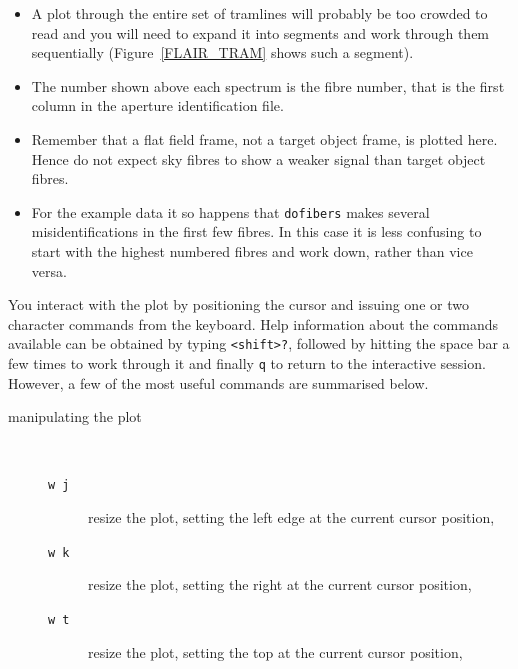 \documentclass[chapters,twoside,11pt]{starlink}
\begin{document}
\begin{enumerate}
  \begin{itemize}

    \item A plot through the entire set of tramlines will probably be
     too crowded to read and you will need to expand it into segments and
     work through them sequentially (Figure~\ref{FLAIR_TRAM} shows such a
     segment).

    \item The number shown above each spectrum is the fibre number, that
     is the first column in the aperture identification file.

    \item Remember that a flat field frame, not a target object frame,
     is plotted here.  Hence do not expect sky fibres to show a weaker
     signal than target object fibres.

    \item For the example data it so happens that \texttt{dofibers} makes
     several misidentifications in the first few fibres.  In this case
     it is less confusing to start with the highest numbered fibres
     and work down, rather than vice versa.

  \end{itemize}

   You interact with the plot by positioning the cursor and issuing
   one or two character commands from the keyboard.  Help information
   about the commands available can be obtained by typing \texttt{<shift>?}, followed by hitting the space bar a few times to work
   through it and finally \texttt{q} to return to the interactive session.
   However, a few of the most useful commands are summarised below.

  \begin{description}

    \item[manipulating the plot] ~

    \begin{description}

      \item[\texttt{w~j}] resize the plot, setting the left edge at the
       current cursor position,

      \item[\texttt{w~k}] resize the plot, setting the right at the
       current cursor position,

      \item[\texttt{w~t}] resize the plot, setting the top at the
       current cursor position,


\end{description}
\end{description}
\end{enumerate}
\end{document}

